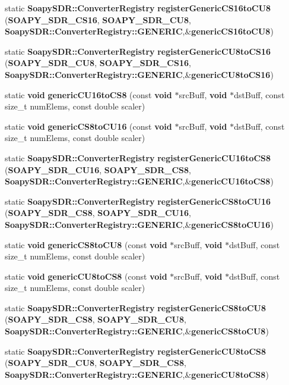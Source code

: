 \begin{DoxyCompactItemize}
static {\bf Soapy\+S\+D\+R\+::\+Converter\+Registry} {\bf register\+Generic\+C\+S16to\+C\+U8} ({\bf S\+O\+A\+P\+Y\+\_\+\+S\+D\+R\+\_\+\+C\+S16}, {\bf S\+O\+A\+P\+Y\+\_\+\+S\+D\+R\+\_\+\+C\+U8}, {\bf Soapy\+S\+D\+R\+::\+Converter\+Registry\+::\+G\+E\+N\+E\+R\+IC},\&{\bf generic\+C\+S16to\+C\+U8})
\item 
static {\bf Soapy\+S\+D\+R\+::\+Converter\+Registry} {\bf register\+Generic\+C\+U8to\+C\+S16} ({\bf S\+O\+A\+P\+Y\+\_\+\+S\+D\+R\+\_\+\+C\+U8}, {\bf S\+O\+A\+P\+Y\+\_\+\+S\+D\+R\+\_\+\+C\+S16}, {\bf Soapy\+S\+D\+R\+::\+Converter\+Registry\+::\+G\+E\+N\+E\+R\+IC},\&{\bf generic\+C\+U8to\+C\+S16})
\item 
static {\bf void} {\bf generic\+C\+U16to\+C\+S8} (const {\bf void} $\ast$src\+Buff, {\bf void} $\ast$dst\+Buff, const size\+\_\+t num\+Elems, const double scaler)
\item 
static {\bf void} {\bf generic\+C\+S8to\+C\+U16} (const {\bf void} $\ast$src\+Buff, {\bf void} $\ast$dst\+Buff, const size\+\_\+t num\+Elems, const double scaler)
\item 
static {\bf Soapy\+S\+D\+R\+::\+Converter\+Registry} {\bf register\+Generic\+C\+U16to\+C\+S8} ({\bf S\+O\+A\+P\+Y\+\_\+\+S\+D\+R\+\_\+\+C\+U16}, {\bf S\+O\+A\+P\+Y\+\_\+\+S\+D\+R\+\_\+\+C\+S8}, {\bf Soapy\+S\+D\+R\+::\+Converter\+Registry\+::\+G\+E\+N\+E\+R\+IC},\&{\bf generic\+C\+U16to\+C\+S8})
\item 
static {\bf Soapy\+S\+D\+R\+::\+Converter\+Registry} {\bf register\+Generic\+C\+S8to\+C\+U16} ({\bf S\+O\+A\+P\+Y\+\_\+\+S\+D\+R\+\_\+\+C\+S8}, {\bf S\+O\+A\+P\+Y\+\_\+\+S\+D\+R\+\_\+\+C\+U16}, {\bf Soapy\+S\+D\+R\+::\+Converter\+Registry\+::\+G\+E\+N\+E\+R\+IC},\&{\bf generic\+C\+S8to\+C\+U16})
\item 
static {\bf void} {\bf generic\+C\+S8to\+C\+U8} (const {\bf void} $\ast$src\+Buff, {\bf void} $\ast$dst\+Buff, const size\+\_\+t num\+Elems, const double scaler)
\item 
static {\bf void} {\bf generic\+C\+U8to\+C\+S8} (const {\bf void} $\ast$src\+Buff, {\bf void} $\ast$dst\+Buff, const size\+\_\+t num\+Elems, const double scaler)
\item 
static {\bf Soapy\+S\+D\+R\+::\+Converter\+Registry} {\bf register\+Generic\+C\+S8to\+C\+U8} ({\bf S\+O\+A\+P\+Y\+\_\+\+S\+D\+R\+\_\+\+C\+S8}, {\bf S\+O\+A\+P\+Y\+\_\+\+S\+D\+R\+\_\+\+C\+U8}, {\bf Soapy\+S\+D\+R\+::\+Converter\+Registry\+::\+G\+E\+N\+E\+R\+IC},\&{\bf generic\+C\+S8to\+C\+U8})
\item 
static {\bf Soapy\+S\+D\+R\+::\+Converter\+Registry} {\bf register\+Generic\+C\+U8to\+C\+S8} ({\bf S\+O\+A\+P\+Y\+\_\+\+S\+D\+R\+\_\+\+C\+U8}, {\bf S\+O\+A\+P\+Y\+\_\+\+S\+D\+R\+\_\+\+C\+S8}, {\bf Soapy\+S\+D\+R\+::\+Converter\+Registry\+::\+G\+E\+N\+E\+R\+IC},\&{\bf generic\+C\+U8to\+C\+S8})
\end{DoxyCompactItemize}


